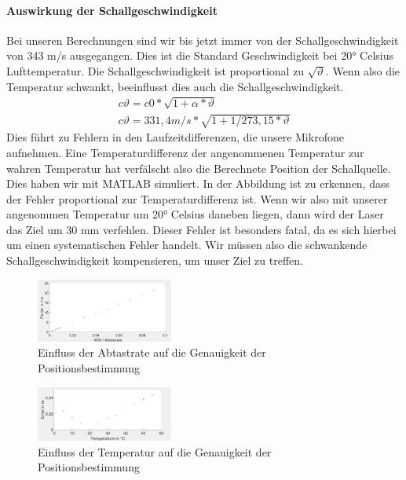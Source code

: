 \paragraph{Auswirkung der Schallgeschwindigkeit}
Bei unseren Berechnungen sind wir bis jetzt immer von der Schallgeschwindigkeit von 343 m/s ausgegangen. Dies ist die Standard Geschwindigkeit bei 20° Celsius Lufttemperatur. Die Schallgeschwindigkeit ist proportional zu $\sqrt{\vartheta}$. Wenn also die Temperatur schwankt, beeinflusst dies auch die Schallgeschwindigkeit. 
\begin{align}
c\vartheta = c0 * \sqrt{1+\alpha * \vartheta}\\   
c\vartheta =  331,4 m/s * \sqrt{1 + 1/273,15 * \vartheta}
\end{align}
Dies führt zu Fehlern in den Laufzeitdifferenzen, die unsere Mikrofone aufnehmen. Eine Temperaturdifferenz der angenommenen Temperatur zur wahren Temperatur hat verfälscht also die Berechnete Position der Schallquelle. Dies haben wir mit MATLAB simuliert. In der Abbildung ist zu erkennen, dass der Fehler proportional zur Temperaturdifferenz ist. Wenn wir also mit unserer angenommen Temperatur um 20° Celsius daneben liegen, dann wird der Laser das Ziel um 30 mm verfehlen. Dieser Fehler ist besonders fatal, da es sich hierbei um einen systematischen Fehler handelt. Wir müssen also die schwankende Schallgeschwindigkeit kompensieren, um unser Ziel zu treffen.

\begin{figure}
\centering 
\includegraphics[width=0.4\textwidth]{Chart Abtastrate}
\caption{Einfluss der Abtastrate auf die Genauigkeit der Positionsbestimmung}\label{fig:Einfluss der Abtastrate auf die Genauigkeit der Positionsbestimmung}
\end{figure}

\begin{figure}
\centering 
\includegraphics[width=0.4\textwidth]{Chart Temperatur}
\caption{Einfluss der Temperatur auf die Genauigkeit der Positionsbestimmung}\label{fig:Einfluss der Temperatur auf die Genauigkeit der Positionsbestimmung}
\end{figure}
